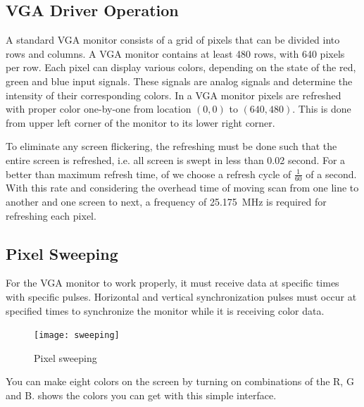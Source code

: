 \documentclass[12pt, logo=tehranDLDL/ut]{tehranDLDL}
\begin{document}
\subsection{VGA Driver Operation}

A standard VGA monitor consists of a grid of pixels that can be divided into rows and columns. A VGA monitor contains at least 480 rows, with 640 pixels per row. Each pixel can display various colors, depending on the state of the red, green and blue input signals. These signals are analog signals and determine the intensity of their corresponding colors. In a VGA monitor pixels are refreshed with proper color one-by-one from location $(0, 0)$ to $(640, 480)$. This is done from upper left corner of the monitor to its lower right corner.

To eliminate any screen flickering, the refreshing must be done such that the entire screen is refreshed, i.e. all screen is swept in less than 0.02 second. For a better than maximum refresh time, of we choose a refresh cycle of $\frac{1}{60}$ of a second. With this rate and considering the overhead time of moving scan from one line to another and one screen to next, a frequency of \SI{25.175}{\mega\hertz} is required for refreshing each pixel.

\subsection{Pixel Sweeping}

For the VGA monitor to work properly, it must receive data at specific times with specific pulses. Horizontal and vertical synchronization pulses must occur at specified times to synchronize the monitor while it is receiving color data.

\begin{figure}
    \centering
    \caption{Pixel sweeping\label{fig:sweeping}}
    \texttt{[image: sweeping]}
\end{figure}

You can make eight colors on the screen by turning on combinations of the R, G and B.  shows the colors you can get with this simple interface.
\end{document}
